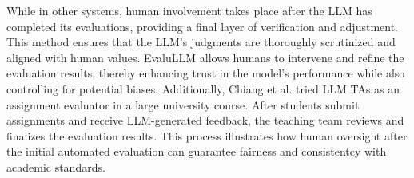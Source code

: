While in other systems, human involvement takes place after the LLM has completed its evaluations, providing a final layer of verification and adjustment. This method ensures that the LLM's judgments are thoroughly scrutinized and aligned with human values.
EvaluLLM\cite{pan2024human} allows humans to intervene and refine the evaluation results, thereby enhancing trust in the model’s performance while also controlling for potential biases.
Additionally, Chiang et al.\cite{chiang2024large} tried LLM TAs as an assignment evaluator in a large university course. After students submit assignments and receive LLM-generated feedback, the teaching team reviews and finalizes the evaluation results. This process illustrates how human oversight after the initial automated evaluation can guarantee fairness and consistentcy with academic standards.

